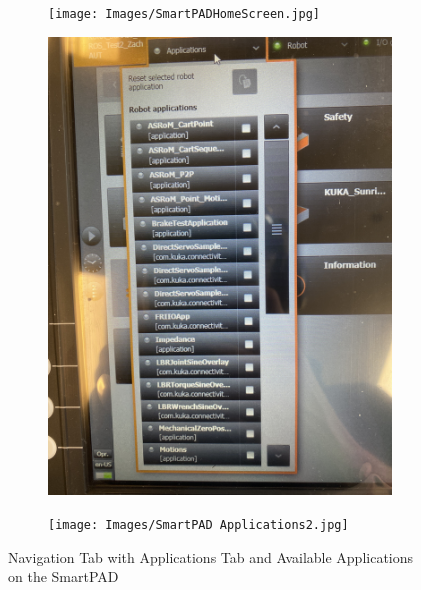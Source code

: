 \documentclass[12pt, letterpaper]{article}
\begin{document}
\begin{figure}[h!]
    \centering
    \begin{subfigure}[b]{0.32\textwidth}
        \centering
        \texttt{[image: Images/SmartPADHomeScreen.jpg]}
        \caption{}
        \label{fig:SmartPAD-NavnApp}
    \end{subfigure}
    \hfill
    \begin{subfigure}[b]{0.32\textwidth}
        \centering
        \includegraphics[width=\textwidth]{Images/SmartPAD Applications1.jpg}
        \caption{}
        \label{fig:SmartPADApplications1}
    \end{subfigure}
    \hfill
    \begin{subfigure}[b]{0.32\textwidth}
        \centering
        \texttt{[image: Images/SmartPAD Applications2.jpg]}
        \caption{}
        \label{fig:SmartPADApplications2}
    \end{subfigure}
    \caption{Navigation Tab with Applications Tab and Available Applications on the SmartPAD}
    \label{fig:SmartPADPrograms}
\end{figure}
\end{document}
